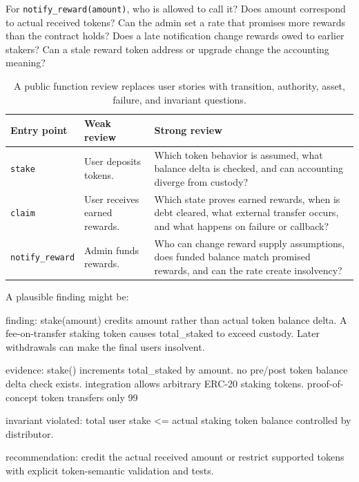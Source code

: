 For \texttt{notify\_reward(amount)}, who is allowed to call it? Does amount correspond to actual received tokens? Can the admin set a rate that promises more rewards than the contract holds? Does a late notification change rewards owed to earlier stakers? Can a stale reward token address or upgrade change the accounting meaning?

\begin{table}[htbp]
\centering
\small
\renewcommand{\arraystretch}{1.18}
\begin{tabularx}{\textwidth}{@{}>{\RaggedRight\arraybackslash}p{}>{\RaggedRight\arraybackslash}p{}>{\RaggedRight\arraybackslash}X@{}}
\toprule
Entry point & Weak review & Strong review \\
\midrule
\texttt{stake} & User deposits tokens. & Which token behavior is assumed, what balance delta is checked, and can accounting diverge from custody? \\
\texttt{claim} & User receives earned rewards. & Which state proves earned rewards, when is debt cleared, what external transfer occurs, and what happens on failure or callback? \\
\texttt{notify\_reward} & Admin funds rewards. & Who can change reward supply assumptions, does funded balance match promised rewards, and can the rate create insolvency? \\
\bottomrule
\end{tabularx}
\caption{A public function review replaces user stories with transition, authority, asset, failure, and invariant questions.}
\end{table}

A plausible finding might be:

\begin{codeblock}
finding:
    stake(amount) credits amount rather than actual token balance delta.
    A fee-on-transfer staking token causes total_staked to exceed custody.
    Later withdrawals can make the final users insolvent.

evidence:
    stake() increments total_staked by amount.
    no pre/post token balance delta check exists.
    integration allows arbitrary ERC-20 staking tokens.
    proof-of-concept token transfers only 99%

invariant violated:
    total user stake <= actual staking token balance controlled by distributor.

recommendation:
    credit the actual received amount or restrict supported tokens
    with explicit token-semantic validation and tests.
\end{codeblock}

